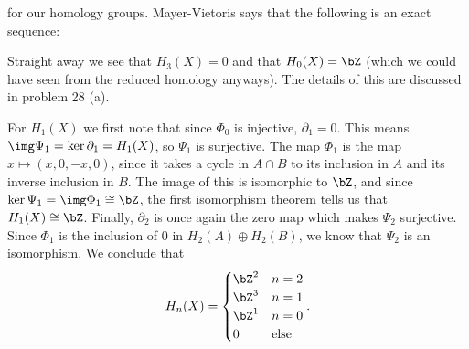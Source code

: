 \begin{homework}[e]
\begin{prf}
\begin{enumerate}[(a)]
\begin{equation*}
        \hspace{3em}
      \end{equation*}
      for our homology groups. Mayer-Vietoris says that the following is an exact sequence:
      \begin{center}
      \end{center}
      Straight away we see that $H_3(X) = 0$ and that $H_0(X) = \bZ$ (which we could have seen from the reduced homology anyways). The details of this are discussed in problem 28 (a). 

      \medskip

      For $H_1(X)$ we first note that since $\Phi_0$ is injective, $\partial_1 = 0$. This means $\img\Psi_1 = \ker\partial_1 = H_1(X)$, so $\Psi_1$ is surjective. The map $\Phi_1$ is the map $x \mapsto (x,0,-x,0)$, since it takes a cycle in $A\cap B$ to its inclusion in $A$ and its inverse inclusion in $B$. The image of this is isomorphic to $\bZ$, and since $\ker\Psi_1 = \img\Phi_1 \cong \bZ$, the first isomorphism theorem tells us that $H_1(X) \cong \bZ$. Finally, $\partial_2$ is once again the zero map which makes $\Psi_2$ surjective. Since $\Phi_1$ is the inclusion of $0$ in $H_2(A) \oplus H_2(B)$, we know that $\Psi_2$ is an isomorphism. We conclude that 
      \begin{equation*}
          H_n(X) = 
          \begin{cases}
              \bZ^2 & n = 2 \\
              \bZ^3 & n = 1 \\
              \bZ^1 & n = 0 \\
              0 & \text{else}
          \end{cases}. 
      \end{equation*}


\end{enumerate}
\end{prf}
\end{homework}

